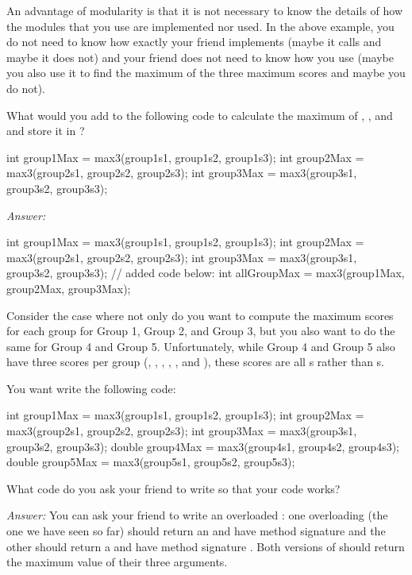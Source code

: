 An advantage of modularity is that it is not necessary
to know the details of how the modules that you use
are implemented nor used.
In the above example, you do not need to know how exactly your
friend implements  (maybe it calls 
and maybe it does not) and your friend does not need to
know how you use  (maybe you also use it to
find the maximum of the three maximum scores and maybe
you do not).

\begin{example}
What would you add to the following code to calculate
the maximum of , ,
and  and store it in ?

\begin{code}
int group1Max = max3(group1s1, group1s2, group1s3);
int group2Max = max3(group2s1, group2s2, group2s3);
int group3Max = max3(group3s1, group3s2, group3s3);
\end{code}

\noindent \emph{Answer:}
\begin{code}
int group1Max = max3(group1s1, group1s2, group1s3);
int group2Max = max3(group2s1, group2s2, group2s3);
int group3Max = max3(group3s1, group3s2, group3s3);
// added code below:
int allGroupMax = max3(group1Max, group2Max, group3Max);
\end{code}
\end{example}

\begin{example}
Consider the case where not only do you
want to compute the maximum scores for each group
for Group 1, Group 2, and Group 3, but you
also want to do the same for Group 4 and Group 5.
Unfortunately, while Group 4 and Group 5 also have
three scores per group (, ,
, , ,
and ), these scores are all s
rather than s.

You want write the following code:
\begin{code}
int group1Max = max3(group1s1, group1s2, group1s3);
int group2Max = max3(group2s1, group2s2, group2s3);
int group3Max = max3(group3s1, group3s2, group3s3);
double group4Max = max3(group4s1, group4s2, group4s3);
double group5Max = max3(group5s1, group5s2, group5s3);
\end{code}

What code do you ask your friend to write
so that your code works?

\noindent \emph{Answer:} You can ask your friend to write
an overloaded : one overloading (the one
we have seen so far) should return an
 and have method signature 
and the other should return a  and have
method signature .
Both versions of  should return the maximum value
of their three arguments.
\end{example}

